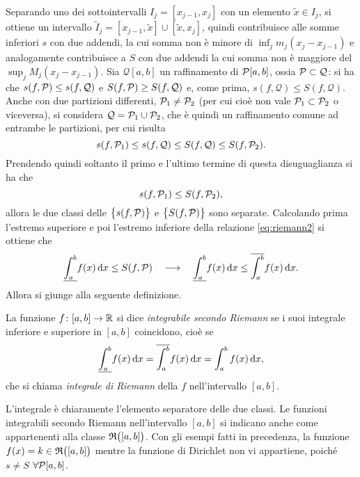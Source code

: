 Separando uno dei sottointervalli $I_j=[x_{j-1},x_j]$ con un elemento $\tilde{x}\in I_j$, si ottiene un intervallo $\tilde{I}_j=[x_{j-1},\tilde{x}]\cup[\tilde{x},x_j]$, quindi contribuisce alle somme inferiori $s$ con due addendi, la cui somma non è minore di $\inf_jm_j(x_j-x_{j-1})$ e analogamente contribuisce a $S$ con due addendi la cui somma non è maggiore del $\sup_jM_j(x_j-x_{j-1})$. %
Sia $\mathcal{Q}[a,b]$ un raffinamento di $\mathcal{P}[a,b]$, ossia $\mathcal{P}\subset\mathcal{Q}$: si ha che $s(f,\mathcal{P})\leq s(f,\mathcal{Q})$ e $S(f,\mathcal{P})\geq S(f,\mathcal{Q})$ e, come prima, $s(f,\mathcal{Q})\leq S(f,\mathcal{Q})$.
Anche con due partizioni differenti, $\mathcal{P}_1\neq\mathcal{P}_2$ (per cui cioè non vale $\mathcal{P}_1\subset\mathcal{P}_2$ o viceversa), si considera $\mathcal{Q}=\mathcal{P}_1\cup\mathcal{P}_2$, che è quindi un raffinamento comune ad entrambe le partizioni, per cui risulta
\[
s(f,\mathcal{P}_1)\leq s(f,\mathcal{Q})\leq S(f,\mathcal{Q})\leq S(f,\mathcal{P}_2).
\]
Prendendo quindi soltanto il primo e l'ultimo termine di questa disuguaglianza si ha che
\begin{equation} \label{eq:riemann2}
s(f,\mathcal{P}_1)\leq S(f,\mathcal{P}_2),
\end{equation}
allora le due classi delle $\big\{s(f,\mathcal{P})\big\}$ e $\big\{S(f,\mathcal{P})\big\}$ sono separate. Calcolando prima l'estremo superiore e poi l'estremo inferiore della relazione \eqref{eq:riemann2} si ottiene che
\[
\underline{\int_a^b} f(x)\,\textup{d} x\leq S(f,\mathcal{P})\quad\longrightarrow\quad\underline{\int_a^b} f(x)\,\textup{d} x\leq\overline{\int_a^b} f(x)\,\textup{d} x.
\]
Allora si giunge alla seguente definizione.
\begin{definizione} \label{d:riemann}
La funzione $f\colon[a,b]\to\mathbb{R}$ si dice \emph{integrabile secondo Riemann} se i suoi integrale inferiore e superiore in $[a,b]$ coincidono, cioè se
\[
\underline{\int_a^b} f(x)\,\textup{d} x=\overline{\int_a^b} f(x)\,\textup{d} x=\int_a^bf(x)\,\textup{d} x,
\]
che si chiama \emph{integrale di Riemann} della $f$ nell'intervallo $[a,b]$.
\end{definizione}
L'integrale è chiaramente l'elemento separatore delle due classi. Le funzioni integrabili secondo Riemann nell'intervallo $[a,b]$ si indicano anche come appartenenti alla classe $\mathfrak{R}\big([a,b]\big)$.
Con gli esempi fatti in precedenza, la funzione $f(x)=k\in\mathfrak{R}\big([a,b]\big)$ mentre la funzione di Dirichlet non vi appartiene, poiché $s\neq S$ $\forall\mathcal{P}[a,b]$.

